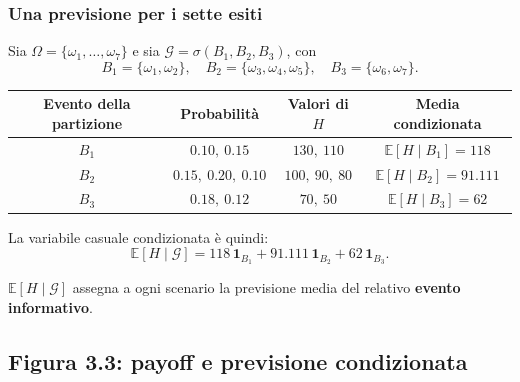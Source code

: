 \documentclass[handout]{beamer}%
\providecommand{\E}{\mathbb{E}}
\providecommand{\G}{\mathcal{G}}
\providecommand{\1}{\mathbf{1}}
\providecommand{\QTR}[2]{\csname #1\endcsname{#2}}
\begin{document}
\begin{frame}%
%

\frametitle{Una previsione per i sette esiti}%
%

%


Sia $\Omega=\{\omega_{1},\ldots,\omega_{7}\}$ e sia $\G=\sigma(B_{1}%
,B_{2},B_{3})$, con
\[
B_{1}=\{\omega_{1},\omega_{2}\},\quad B_{2}=\{\omega_{3},\omega_{4},\omega
_{5}\},\quad B_{3}=\{\omega_{6},\omega_{7}\}.
\]


\medskip

\begin{center}
{\scriptsize
\begin{tabular}
[c]{c|c|c|c}%
Evento della partizione & Probabilit\`{a} & Valori di $H$ & Media
condizionata\\\hline
$B_{1}$ & $0.10,\ 0.15$ & $130,\ 110$ & $\E[H\mid B_1]=118$\\
$B_{2}$ & $0.15,\ 0.20,\ 0.10$ & $100,\ 90,\ 80$ & $\E[H\mid B_2]=91.111$\\
$B_{3}$ & $0.18,\ 0.12$ & $70,\ 50$ & $\E[H\mid B_3]=62$%
\end{tabular}
}
\end{center}

\medskip

La variabile casuale condizionata \`{e} quindi:
\[
\E[H\mid\G] = 118\,\1_{B_{1}} + 91.111\,\1_{B_{2}} + 62\,\1_{B_{3}}.
\]


\medskip

\begin{center}
{\small $\E[H\mid\G]$ assegna a ogni scenario la previsione media del relativo
\textbf{evento informativo}.}
\end{center}%

\transboxout
\end{frame}%


\subsection{Figura 3.3: payoff e previsione condizionata}%
\end{document}
